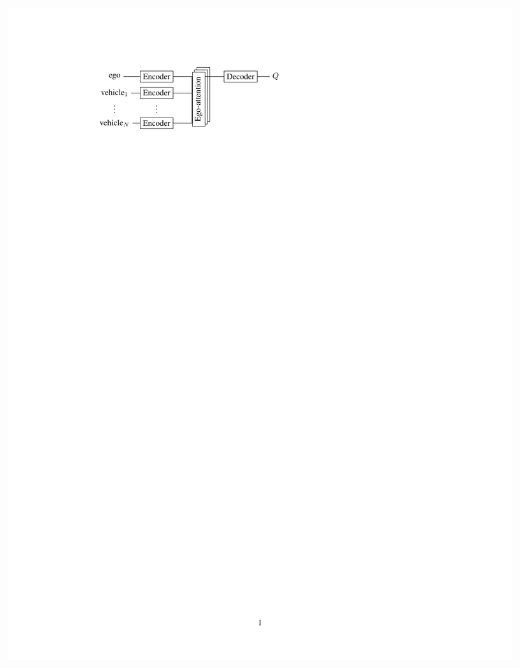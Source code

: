 \documentclass[a0paper,portrait,fontscale=0.3, margin=2cm]{baposter}
\begin{document}
\begin{poster}
{\begin{center}
\begin{minipage}{0.59\textwidth}
		\includegraphics[trim={3.8cm 18.3cm 5.8cm 2.5cm}, clip, page=2, width=\linewidth]{img/architecture}
	\end{minipage}


\end{center}

}


\end{poster}
\end{document}
